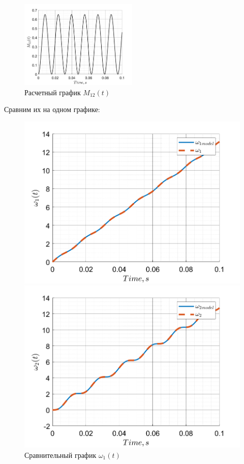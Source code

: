 \begin{figure}[!h]
    \centering
    \includegraphics[width=0.5\textwidth]{img/count_M12}
    \caption{Расчетный график $M_{12}(t)$}
    \label{fig:count_M12}
\end{figure}
\newpage
Сравним их на одном графике:
\begin{figure}[!h]
    \centering
    \begin{minipage}{0.5\textwidth}
        \centering
        \includegraphics[width = \textwidth]{img/all_omega1}
        \caption{Сравнительный график $\omega_1(t)$}
    \end{minipage}%
    \begin{minipage}{0.5\textwidth}
        \centering
        \includegraphics[width = \textwidth]{img/all_omega2}

\end{minipage}
\end{figure}
